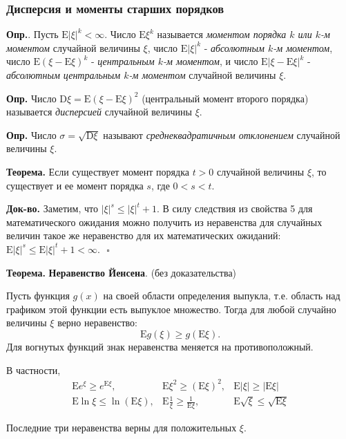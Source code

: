 \documentclass[oneside,final,14pt]{extreport}
\newcommand\mydef{{\bf Опр.}}
\newcommand\myth{{\bf Теорема.}}
\newcommand\myqed{{\bf Док-во.}}
\theoremstyle{definition}
\begin{document}
\subsubsection{Дисперсия и моменты старших порядков}

\mydef{}. Пусть $\mathrm{E}|\xi|^k < \infty.$ Число $\mathrm{E}\xi^k$ называется {\it моментом порядка $k$ или $k$-м моментом} случайной величины $\xi$, число $\mathrm{E}|\xi|^k$ - {\it абсолютным $k$-м моментом}, число $\mathrm{E}(\xi - \mathrm{E}\xi)^k$ - {\it центральным $k$-м моментом}, и число $\mathrm{E}|\xi - \mathrm{E}\xi|^k$ - {\it абсолютным центральным $k$-м моментом} случайной величины $\xi$. 

\mydef{} Число $\mathrm{D}\xi = \mathrm{E}(\xi - \mathrm{E}\xi)^2$ (центральный момент второго порядка) называется {\it дисперсией} случайной величины $\xi$.

\mydef{} Число $\sigma = \sqrt{\mathrm{D}\xi}$ называют {\it среднеквадратичным отклонением} случайной величины $\xi$.

\myth{} Если существует момент порядка $t > 0$ случайной величины $\xi$, то существует и ее момент порядка $s$, где $0 < s < t$.

\myqed{} Заметим, что $|\xi|^s \leq |\xi|^t + 1.$ В силу следствия из свойства 5 для математического ожидания можно получить из неравенства для случайных величин такое же неравенство для их математических ожиданий: $\mathrm{E}|\xi|^s \leq \mathrm{E}|\xi|^t + 1 < \infty. ~~~ \square$

\myth{} \textbf{Неравенство Йенсена}. (без доказательства)

Пусть функция $g(x)$ на своей области определения выпукла, т.е. область над графиком этой функции есть выпуклое множество. Тогда для любой случайно величины $\xi$ верно неравенство: 
$$\mathrm{E}g(\xi) \geq g(\mathrm{E}\xi).$$
Для вогнутых функций знак неравенства меняется на противоположный.

В частности,
$$\begin{array}{ccc}
\mathrm{E} e^{\xi} \geqslant e^{\mathrm{E} \xi}, & \mathrm{E} \xi^{2} \geqslant(\mathrm{E} \xi)^{2}, & \mathrm{E}|\xi| \geqslant|\mathrm{E} \xi| \\
\mathrm{E} \ln \xi \leqslant \ln (\mathrm{E} \xi), & \mathrm{E} \frac{1}{\xi} \geqslant \frac{1}{\mathrm{E} \xi}, & \mathrm{E} \sqrt{\xi} \leqslant \sqrt{\mathrm{E} \xi}
\end{array}$$

Последние три неравенства верны для положительных $\xi$.
\end{document}
